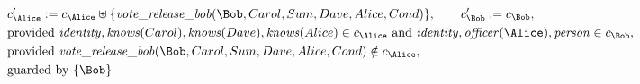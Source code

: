 \begin{align*}
&
c'_
{
\Alice
}
 := 
c_
{
\Alice
}
 \uplus 
\{
\mathit{\detokenize{
vote_release_bob
}}
(
\Bob
,
Carol
,
Sum
,
Dave
,
Alice
,
Cond
)
\}
, \qquad 
c'_
{
\Bob
}
 := 
c_
{
\Bob
}
,\\
&
\text{provided } 
\mathit{\detokenize{
identity
}}
,
\mathit{\detokenize{
knows
}}
(
Carol
)
,
\mathit{\detokenize{
knows
}}
(
Dave
)
,
\mathit{\detokenize{
knows
}}
(
Alice
)
 \in c_
{
\Alice
}
 \text{ and } 
\mathit{\detokenize{
identity
}}
,
\mathit{\detokenize{
officer
}}
(
\Alice
)
,
\mathit{\detokenize{
person
}}
 \in c_
{
\Bob
}
,\\
&
\text{provided } 
\mathit{\detokenize{
vote_release_bob
}}
(
\Bob
,
Carol
,
Sum
,
Dave
,
Alice
,
Cond
)
 \notin c_
{
\Alice
}
,\\
&
\text{guarded by } \{
\Bob
\}
\end{align*}

